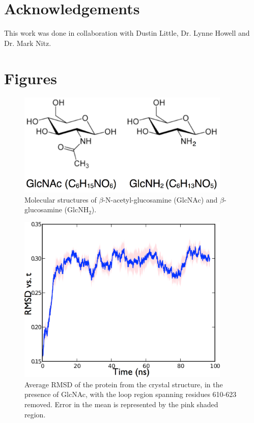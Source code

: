 {\section{Acknowledgements}
This work was done in collaboration with Dustin Little, Dr. Lynne Howell and Dr. Mark Nitz.

\section{Figures}

\begin{figure}[htbp]
\centering
\includegraphics[width=4in]{figures/results4/sugar_structures.pdf}
\caption[Molecular structures of GlcNAc and GlcNH$_2$]{Molecular structures of $\beta$-N-acetyl-glucosamine (GlcNAc) and $\beta$-glucosamine (GlcNH$_2$).}
\label{fig:nag}
\end{figure}

\begin{figure}[htbp]
\centering
\includegraphics[width=4in]{figures/results4/rmsd.pdf}
\caption[RMSD vs. time of PgaB]{Average RMSD of the protein from the crystal structure, in the presence of GlcNAc, with the loop region spanning residues 610-623 removed. Error in the mean is represented by the pink shaded region.}
\label{fig:rmsd}
\end{figure}

}
